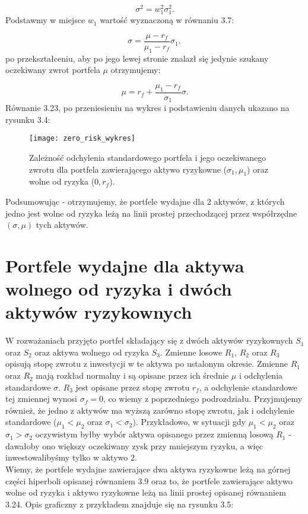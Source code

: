 \documentclass[magister]{dyplom}
\begin{document}
\begin{equation}
\sigma^2 = w_1^{2}\sigma_1^{2}.
\end{equation}
Podstawmy w miejsce $w_1$ wartość wyznaczoną w równaniu 3.7:

\begin{equation}
	\sigma = \frac{\mu - r_f}{\mu_1 - r_f}\sigma_1,
\end{equation}
po przekształceniu, aby po jego lewej stronie znalazł się jedynie szukany oczekiwany zwrot portfela $\mu$ otrzymujemy:

\begin{equation}
	\mu = r_f + \frac{\mu_1 - r_f}{\sigma_1}\sigma.
\end{equation}
Równanie 3.23, po przeniesieniu na wykres i podstawieniu danych ukazano na rysunku 3.4:

\begin{figure}[h]
	\centering
	\texttt{[image: zero\_risk\_wykres]}
	\caption{Zależność odchylenia standardowego portfela i jego oczekiwanego zwrotu dla portfela zawierającego aktywo ryzykowne ($\sigma_1, \mu_1$) oraz wolne od ryzyka ($0, r_f$).}
\end{figure}

Podsumowując - otrzymujemy, że portfele wydajne dla 2 aktywów, z których jedno jest wolne od ryzyka leżą na linii prostej przechodzącej przez współrzędne $(\sigma, \mu)$ tych aktywów.

\section{Portfele wydajne dla aktywa wolnego od ryzyka i dwóch aktywów ryzykownych}
W rozważaniach przyjęto portfel składający się z dwóch aktywów ryzykownych $S_1$ oraz $S_2$ oraz aktywa wolnego od ryzyka $S_3$. Zmienne losowe $R_1$, $R_2$ oraz $R_3$ opisują stopę zwrotu z inwestycji w te aktywa po ustalonym okresie. Zmienne $R_1$ oraz $R_2$ mają rozkład normalny i są opisane przez ich średnie $\mu$ i odchylenia standardowe $\sigma$. $R_3$ jest opisane przez stopę zwrotu $r_f$, a odchylenie standardowe tej zmiennej wynosi $\sigma_f = 0$, co wiemy z poprzedniego podrozdziału. Przyjmujemy również, że jedno z aktywów ma wyższą zarówno stopę zwrotu, jak i odchylenie standardowe ($\mu_1 < \mu_2$ oraz $\sigma_1 < \sigma_2$). Przykładowo, w sytuacji gdy $\mu_1 < \mu_2$ oraz $\sigma_1 > \sigma_2$ oczywistym byłby wybór aktywa opisanego przez zmienną losową $R_1$ - dawałoby ono większy oczekiwany zysk przy mniejszym ryzyku, a więc inwestowalibyśmy tylko w aktywo 2.\\
Wiemy, że portfele wydajne zawierające dwa aktywa ryzykowne leżą na górnej części hiperboli opisanej równaniem 3.9 oraz to, że portfele zawierające aktywo wolne od ryzyka i aktywo ryzykowne leżą na linii prostej opisanej równaniem 3.24. Opis graficzny z przykładem znajduje się na rysunku 3.5:\\ 
\end{document}
